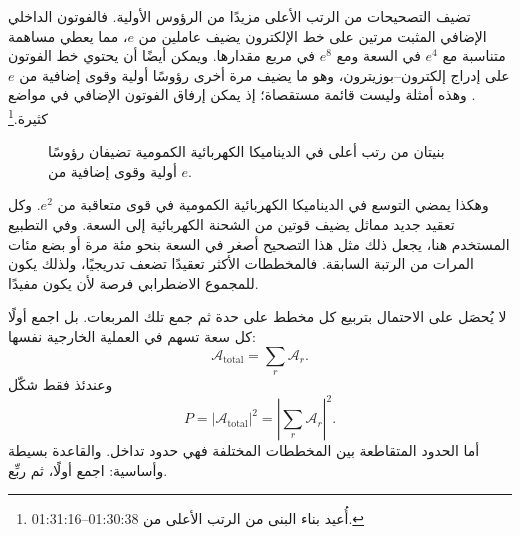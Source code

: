 تضيف التصحيحات من الرتب الأعلى مزيدًا من الرؤوس الأولية. فالفوتون الداخلي الإضافي المثبت مرتين على خط الإلكترون يضيف عاملين من \(e\)، مما يعطي مساهمة متناسبة مع \(e^4\) في السعة ومع \(e^8\) في مربع مقدارها. ويمكن أيضًا أن يحتوي خط الفوتون على إدراج إلكترون--بوزيترون، وهو ما يضيف مرة أخرى رؤوسًا أولية وقوى إضافية من \(e\). وهذه أمثلة وليست قائمة مستقصاة؛ إذ يمكن إرفاق الفوتون الإضافي في مواضع كثيرة.\footnote{أُعيد بناء البنى من الرتب الأعلى من 01:30:38--01:31:16.}

\begin{figure}[htbp]
\centering
{}
\caption{بنيتان من رتب أعلى في الديناميكا الكهربائية الكمومية تضيفان رؤوسًا أولية وقوى إضافية من \(e\).}
\end{figure}

وهكذا يمضي التوسع في الديناميكا الكهربائية الكمومية في قوى متعاقبة من \(e^2\). وكل تعقيد جديد مماثل يضيف قوتين من الشحنة الكهربائية إلى السعة. وفي التطبيع المستخدم هنا، يجعل ذلك مثل هذا التصحيح أصغر في السعة بنحو مئة مرة أو بضع مئات المرات من الرتبة السابقة. فالمخططات الأكثر تعقيدًا تضعف تدريجيًا، ولذلك يكون للمجموع الاضطرابي فرصة لأن يكون مفيدًا.

لا يُحصَل على الاحتمال بتربيع كل مخطط على حدة ثم جمع تلك المربعات. بل اجمع أولًا كل سعة تسهم في العملية الخارجية نفسها:
\begin{equation}
\mathcal{A}_{\mathrm{total}}=\sum_r\mathcal{A}_r.
\end{equation}
وعندئذ فقط شكّل
\begin{equation}
P=\left|\mathcal{A}_{\mathrm{total}}\right|^2
=\left|\sum_r\mathcal{A}_r\right|^2.
\end{equation}
أما الحدود المتقاطعة بين المخططات المختلفة فهي حدود تداخل. والقاعدة بسيطة وأساسية: اجمع أولًا، ثم ربِّع.

